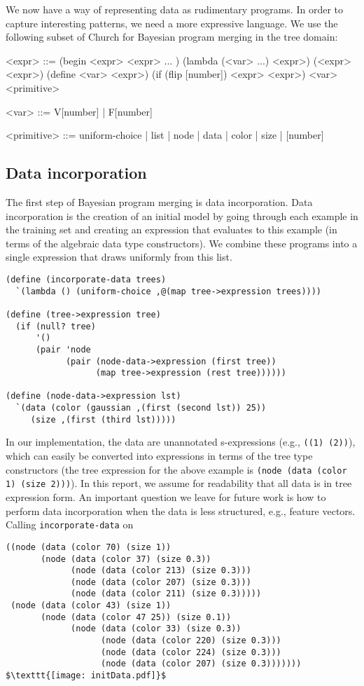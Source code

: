 \documentclass[a4paper,10pt]{article}
\begin{document}
We now have a way of representing data as rudimentary programs.  In order to capture interesting patterns, we need a more expressive language.  We use the following subset of Church for Bayesian program merging in the tree domain:
\begin{grammar}
<expr> ::= (begin <expr> <expr> ... ) 
\alt (lambda (<var> ...) <expr>)
\alt (<expr> <expr>)  
\alt (define <var> <expr>)
\alt (if (flip [number]) <expr> <expr>)
\alt <var> 
\alt <primitive>

<var> ::= V[number] | F[number] 

<primitive> ::= uniform-choice | list | node | data | color | size | [number]
\end{grammar}

\subsection{Data incorporation}
The first step of Bayesian program merging is data incorporation.  Data incorporation is the creation of an initial model by going through each example in the training set and creating an expression that evaluates to this example (in terms of the algebraic data type constructors).  We combine these programs into a single expression that draws uniformly from this list.
\begin{lstlisting}[frame=trblsingle]
(define (incorporate-data trees)
  `(lambda () (uniform-choice ,@(map tree->expression trees))))

(define (tree->expression tree)
  (if (null? tree)
      '()
      (pair 'node
            (pair (node-data->expression (first tree)) 
                  (map tree->expression (rest tree))))))

(define (node-data->expression lst)
  `(data (color (gaussian ,(first (second lst)) 25)) 
	 (size ,(first (third lst)))))
\end{lstlisting}
In our implementation, the data are unannotated s-expressions (e.g., \texttt{((1) (2))}), which can easily be converted into expressions in terms of the tree type constructors (the tree expression for the above example is \texttt{(node (data (color 1) (size 2)))}).  In this report, we assume for readability that all data is in tree expression form. An important question we leave for future work is how to perform data incorporation when the data is less structured, e.g., feature vectors. Calling \texttt{incorporate-data} on
\begin{lstlisting}[mathescape=true]
((node (data (color 70) (size 1))
       (node (data (color 37) (size 0.3))
             (node (data (color 213) (size 0.3)))
             (node (data (color 207) (size 0.3)))
             (node (data (color 211) (size 0.3)))))
 (node (data (color 43) (size 1))
       (node (data (color 47 25)) (size 0.1))
             (node (data (color 33) (size 0.3))
                   (node (data (color 220) (size 0.3)))
                   (node (data (color 224) (size 0.3)))
                   (node (data (color 207) (size 0.3)))))))
$\texttt{[image: initData.pdf]}$
\end{lstlisting}
\end{document}
